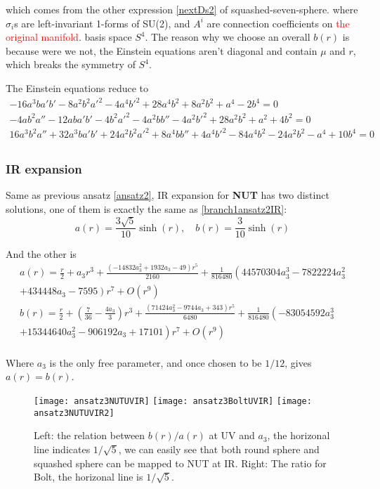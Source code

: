 \documentclass[12pt, a4paper]{article}
\numberwithin{equation}{section}
\newcommand{\be}{\begin{equation}}
\newcommand{\ee}{\end{equation}}
\begin{document}
	which comes from the other expression \ref{nextDs2} of squashed-seven-sphere. where $\sigma_i$s are left-invariant 1-forms of SU(2), and $A^i$ are connection coefficients on {\textcolor{red}{the original manifold}}.\cite{Bizon:2007ss}\cite{Page:1985lb} basis space $S^4$. The reason why we choose an overall $b(r)$ is because were we not, the Einstein equations aren't diagonal and contain $\mu$ and $r$, which breaks the symmetry of $S^4$.
	
	The Einstein equations reduce to
\be
\begin{aligned}
	-16 a^3 b a' b'-8 a^2 b^2 a'^2-4 a^4 b'^2+28 a^4 b^2+8 a^2 b^2+a^4-2 b^4 = 0\\
	-4 a b^2 a''-12 a b a' b'-4 b^2 a'^2-4 a^2 b b''-4 a^2 b'^2+28 a^2 b^2+a^2+4 b^2 = 0\\
	16 a^3 b^2 a''+32 a^3 b a' b'+24 a^2 b^2 a'^2+8 a^4 b b''+4 a^4 b'^2-84 a^4 b^2-24 a^2 b^2-a^4+10 b^4 = 0\\
\end{aligned}
\label{EinsteinEquations3}
\ee
	\subsubsection{IR expansion}
	Same as previous ansatz \ref{ansatz2}, IR expansion for \textbf{NUT} has two distinct solutions, one of them is exactly the same as \ref{branch1ansatz2IR}:
\be
	a(r) = \frac{3\sqrt{5}}{10} \sinh(r),\quad b(r) = \frac{3}{10}\sinh(r)
\ee

	And the other is 
\be
\begin{aligned}
	a(r) = \frac{r}{2}+a_3 r^3+\frac{\left(-14832 a_3^2+1932 a_3-49\right) r^5}{2160}+\frac{1}{816480}\left(44570304 a_3^3-7822224 a_3^2\right.\\
	\left.+434448 a_3-7595\right)
		r^7 + O\left(r^9\right)\\
	b(r) = \frac{r}{2}+\left(\frac{7}{36}-\frac{4 a_3}{3}\right) r^3+\frac{\left(71424 a_3^2-9744 a_3+343\right) r^5}{6480}+\frac{1}{816480}\left(-83054592 a_3^3\right.\\
	\left.+15344640
		a_3^2-906192 a_3+17101\right) r^7+O\left(r^9\right)\\
\end{aligned}	
\ee

	Where $a_3$ is the only free parameter, and once chosen to be $1/12$, gives $a(r) = b(r)$. 
	
\begin{figure}[t]
	\centering
	\texttt{[image: ansatz3NUTUVIR]}
	\hfil
	\texttt{[image: ansatz3BoltUVIR]}
	\texttt{[image: ansatz3NUTUVIR2]}
	\caption{{\rm Left: the relation between $b(r)/a(r)$ at UV and $a_3$, the horizonal line indicates $1/\sqrt{5}$, we can easily see that both round sphere and squashed sphere can be mapped to NUT at IR. Right: The ratio for Bolt, the horizonal line is $1/\sqrt{5}$.}}
	\label{ansatz3NUTUVIR}
\end{figure}
	
\end{document}
